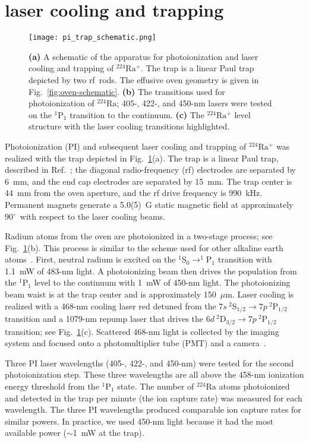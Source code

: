 \documentclass[
 reprint,
 amsmath,amssymb,
 aps,
 prr,
 superscriptaddress,
]{revtex4-2}
\newcommand{\iso}[2]{\ensuremath{^{#2}\mathrm{#1}}}
\begin{document}
\section{laser cooling and trapping}

\begin{figure}
    \centering
    \texttt{[image: pi\_trap\_schematic.png]}
    \caption{\textbf{(a)} A schematic of the apparatus for photoionization and laser cooling and trapping of \iso{Ra}{224}$^+$. The trap is a linear Paul trap depicted by two rf~rods. The effusive oven geometry is given in Fig.~\ref{fig:oven-schematic}. 
    \textbf{(b)} The transitions used for photoionization of \iso{Ra}{224}; 405-, 422-, and 450-nm lasers were tested on the $^1$P$_1$ transition to the continuum.  
    \textbf{(c)} The \iso{Ra}{224}$^+$ level structure with the laser cooling transitions highlighted.}
    \label{fig:pi-trap-schematic}
\end{figure}

Photoionization (PI) and subsequent laser cooling and trapping of \iso{Ra}{224}$^+$ was realized with the trap depicted in Fig.~\ref{fig:pi-trap-schematic}(a). The trap is a linear Paul trap, described in Ref.~\cite{Fan2019}; the diagonal radio-frequency (rf) electrodes are separated by 6~mm, and the end cap electrodes are separated by 15~mm. The trap center is 44~mm from the oven aperture, and the rf drive frequency is 990~kHz. Permanent magnets generate a 5.0(5)~G static magnetic field at approximately 90$^\circ$\ with respect to the laser cooling beams.

Radium atoms from the oven are photoionized in a two-stage process; see Fig.~\ref{fig:pi-trap-schematic}(b). This process is similar to the scheme used for other alkaline earth atoms~\cite{Lucas2004,Vant2006}. First, neutral radium is excited on the \mbox{$^1$S$_0 \rightarrow ^1$P$_1$} transition with 1.1~mW of 483-nm light. A photoionizing beam then drives the population from the $^1$P$_1$ level to the continuum with 1~mW of 450-nm light. The photoionizing beam waist is at the trap center and is approximately 150~$\mu$m. Laser cooling is realized with a 468-nm cooling laser red detuned from the \mbox{7$s\ ^2$S$_{1/2} \rightarrow 7p\ ^2$P$_{1/2}$} transition and a 1079-nm repump laser that drives the \mbox{6$d\ ^2$D$_{3/2} \rightarrow 7p\ ^2$P$_{1/2}$} transition; see Fig.~\ref{fig:pi-trap-schematic}(c). Scattered 468-nm light is collected by the imaging system and focused onto a photomultiplier tube (PMT) and a camera~\cite{Fan2019}.

Three PI laser wavelengths (405-, 422-, and 450-nm) were tested for the second photoionization step. These three wavelengths are all above the 458-nm ionization energy threshold from the $^1$P$_1$ state. The number of \iso{Ra}{224} atoms photoionized and detected in the trap per minute (the ion capture rate) was measured for each wavelength. The three PI wavelengths produced comparable ion capture rates for similar powers. In practice, we used 450-nm light because it had the most available power ($\sim$1~mW at the trap).
\end{document}
